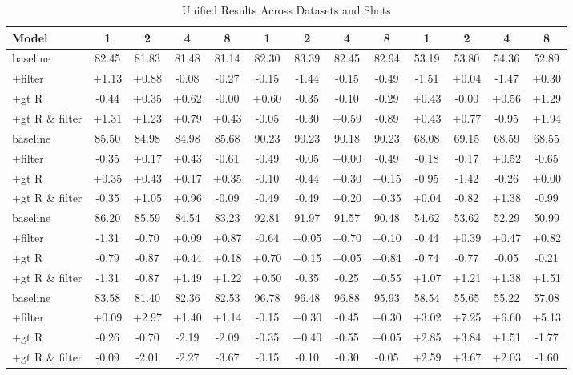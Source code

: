 \begin{table}
\caption{Unified Results Across Datasets and Shots}
\label{tab:all_results}
\begin{tabular}{lcccccccccccc}
\toprule
Model & 1 & 2 & 4 & 8 & 1 & 2 & 4 & 8 & 1 & 2 & 4 & 8 \\
\midrule
baseline & 82.45 & 81.83 & 81.48 & 81.14 & 82.30 & 83.39 & 82.45 & 82.94 & 53.19 & 53.80 & 54.36 & 52.89 \\
+filter & +1.13 & +0.88 & -0.08 & -0.27 & -0.15 & -1.44 & -0.15 & -0.49 & -1.51 & +0.04 & -1.47 & +0.30 \\
+gt R & -0.44 & +0.35 & +0.62 & -0.00 & +0.60 & -0.35 & -0.10 & -0.29 & +0.43 & -0.00 & +0.56 & +1.29 \\
+gt R \& filter & +1.31 & +1.23 & +0.79 & +0.43 & -0.05 & -0.30 & +0.59 & -0.89 & +0.43 & +0.77 & -0.95 & +1.94 \\
baseline & 85.50 & 84.98 & 84.98 & 85.68 & 90.23 & 90.23 & 90.18 & 90.23 & 68.08 & 69.15 & 68.59 & 68.55 \\
+filter & -0.35 & +0.17 & +0.43 & -0.61 & -0.49 & -0.05 & +0.00 & -0.49 & -0.18 & -0.17 & +0.52 & -0.65 \\
+gt R & +0.35 & +0.43 & +0.17 & +0.35 & -0.10 & -0.44 & +0.30 & +0.15 & -0.95 & -1.42 & -0.26 & +0.00 \\
+gt R \& filter & -0.35 & +1.05 & +0.96 & -0.09 & -0.49 & -0.49 & +0.20 & +0.35 & +0.04 & -0.82 & +1.38 & -0.99 \\
baseline & 86.20 & 85.59 & 84.54 & 83.23 & 92.81 & 91.97 & 91.57 & 90.48 & 54.62 & 53.62 & 52.29 & 50.99 \\
+filter & -1.31 & -0.70 & +0.09 & +0.87 & -0.64 & +0.05 & +0.70 & +0.10 & -0.44 & +0.39 & +0.47 & +0.82 \\
+gt R & -0.79 & -0.87 & +0.44 & +0.18 & +0.70 & +0.15 & +0.05 & +0.84 & -0.74 & -0.77 & -0.05 & -0.21 \\
+gt R \& filter & -1.31 & -0.87 & +1.49 & +1.22 & +0.50 & -0.35 & -0.25 & +0.55 & +1.07 & +1.21 & +1.38 & +1.51 \\
baseline & 83.58 & 81.40 & 82.36 & 82.53 & 96.78 & 96.48 & 96.88 & 95.93 & 58.54 & 55.65 & 55.22 & 57.08 \\
+filter & +0.09 & +2.97 & +1.40 & +1.14 & -0.15 & +0.30 & -0.45 & +0.30 & +3.02 & +7.25 & +6.60 & +5.13 \\
+gt R & -0.26 & -0.70 & -2.19 & -2.09 & -0.35 & +0.40 & -0.55 & +0.05 & +2.85 & +3.84 & +1.51 & -1.77 \\
+gt R \& filter & -0.09 & -2.01 & -2.27 & -3.67 & -0.15 & -0.10 & -0.30 & -0.05 & +2.59 & +3.67 & +2.03 & -1.60 \\

\end{tabular}
\end{table}
